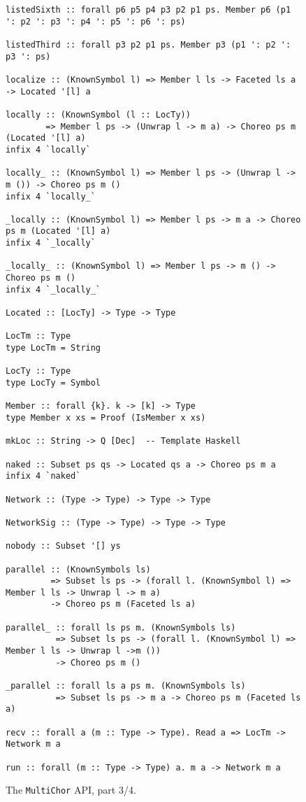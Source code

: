 \documentclass[sigplan,screen]{acmart}
\newcommand{\MultiChor}{\texttt{Multi\-Chor}\xspace}
\begin{document}
\begin{figure*}\ContinuedFloat
\begin{mdframed}
\begin{verbatim}
listedSixth :: forall p6 p5 p4 p3 p2 p1 ps. Member p6 (p1 ': p2 ': p3 ': p4 ': p5 ': p6 ': ps)

listedThird :: forall p3 p2 p1 ps. Member p3 (p1 ': p2 ': p3 ': ps)

localize :: (KnownSymbol l) => Member l ls -> Faceted ls a -> Located '[l] a

locally :: (KnownSymbol (l :: LocTy))
        => Member l ps -> (Unwrap l -> m a) -> Choreo ps m (Located '[l] a)
infix 4 `locally`

locally_ :: (KnownSymbol l) => Member l ps -> (Unwrap l -> m ()) -> Choreo ps m ()
infix 4 `locally_`

_locally :: (KnownSymbol l) => Member l ps -> m a -> Choreo ps m (Located '[l] a)
infix 4 `_locally`

_locally_ :: (KnownSymbol l) => Member l ps -> m () -> Choreo ps m ()
infix 4 `_locally_`

Located :: [LocTy] -> Type -> Type

LocTm :: Type
type LocTm = String

LocTy :: Type
type LocTy = Symbol

Member :: forall {k}. k -> [k] -> Type
type Member x xs = Proof (IsMember x xs)

mkLoc :: String -> Q [Dec]  -- Template Haskell

naked :: Subset ps qs -> Located qs a -> Choreo ps m a
infix 4 `naked`

Network :: (Type -> Type) -> Type -> Type

NetworkSig :: (Type -> Type) -> Type -> Type

nobody :: Subset '[] ys

parallel :: (KnownSymbols ls)
         => Subset ls ps -> (forall l. (KnownSymbol l) => Member l ls -> Unwrap l -> m a)
         -> Choreo ps m (Faceted ls a)

parallel_ :: forall ls ps m. (KnownSymbols ls)
          => Subset ls ps -> (forall l. (KnownSymbol l) => Member l ls -> Unwrap l ->m ())
          -> Choreo ps m ()

_parallel :: forall ls a ps m. (KnownSymbols ls)
          => Subset ls ps -> m a -> Choreo ps m (Faceted ls a)

recv :: forall a (m :: Type -> Type). Read a => LocTm -> Network m a

run :: forall (m :: Type -> Type) a. m a -> Network m a
\end{verbatim}
\caption{The \MultiChor API, part 3/4.}
\end{mdframed}
\end{figure*}
\end{document}
